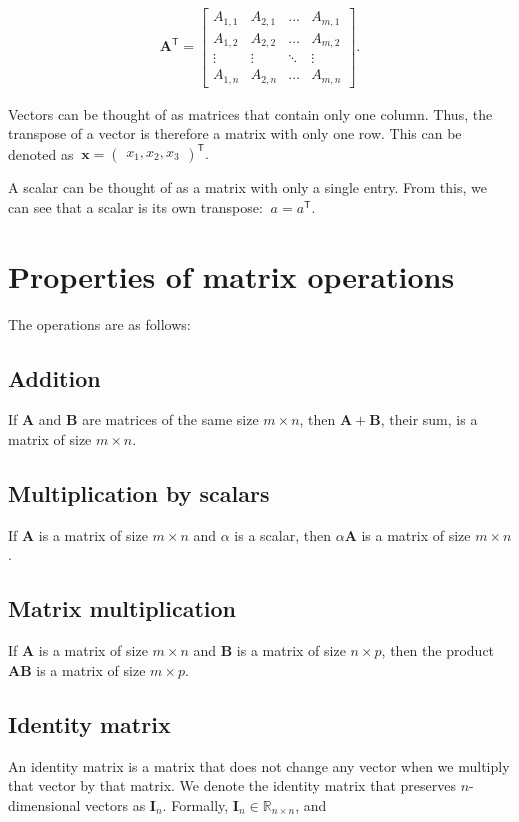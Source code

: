 \documentclass[12pt]{article}
\begin{document}
\begin{align}
\mathbf{A}^{\mathsf{T}} = \begin{bmatrix} {A}_{1,1} & {A}_{2,1} & \ldots & {A}_{m,1}\\ {A}_{1,2} & {A}_{2,2} & \ldots & {A}_{m,2} \\ \vdots & \vdots & \ddots & \vdots \\ {A}_{1,n} & {A}_{2,n} & \ldots & {A}_{m,n}\end{bmatrix}.
\end{align}

Vectors can be thought of as matrices that contain only one column. Thus, the transpose of a vector is therefore a matrix with only one row. This can be denoted as $\ \mathbf{x} = {\begin{pmatrix}x_{1},x_{2},x_{3}\end{pmatrix}}^{\mathsf{T}}.$

A scalar can be thought of as a matrix with only a single entry. From this, we can see that a scalar is its own transpose: $\ a = a^{\mathsf{T}}.$

\section{Properties of matrix operations}

The operations are as follows:

\subsection{Addition}
If $\mathbf{A}$ and $\mathbf{B}$ are matrices of the same size $m\times n$, then $\mathbf{A} + \mathbf{B}$,
their sum, is a matrix of size $m\times n$.

\subsection{Multiplication by scalars}
If $\mathbf{A}$ is a matrix of size $m\times n$ and $\alpha$ is a scalar,
then $\alpha\mathbf{A}$ is a matrix of size $m\times n$.

\subsection{Matrix multiplication}
If $\mathbf{A}$ is a matrix of size $m\times n$ and $\mathbf{B}$ is a matrix of size $n\times p$, 
then the product $\mathbf{AB}$ is a matrix of size $m\times p$.

\subsection{Identity matrix}
An identity matrix is a matrix that does not change any vector when we multiply that vector by that matrix. 
We denote the identity matrix that preserves $n$-dimensional vectors as $\mathbf{I}_{n}$. Formally, 
$\mathbf{I}_{n}\in\mathbb{R}_{n\times n}$, and
\end{document}
